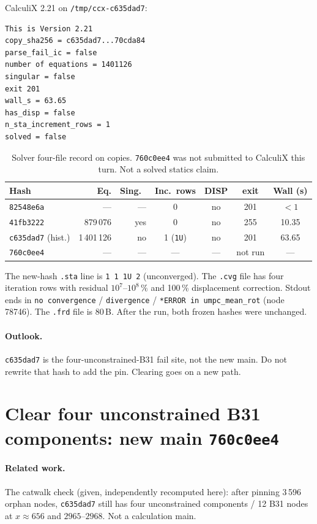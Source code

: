 \documentclass[11pt,a4paper]{article}
\begin{document}
CalculiX 2.21 on \texttt{/tmp/ccx-c635dad7}:
\begin{lstlisting}
This is Version 2.21
copy_sha256 = c635dad7...70cda84
parse_fail_ic = false
number of equations = 1401126
singular = false
exit 201
wall_s = 63.65
has_disp = false
n_sta_increment_rows = 1
solved = false
\end{lstlisting}

\begin{table}[ht]
\centering
\caption{Solver four-file record on copies. \texttt{760c0ee4} was not submitted to CalculiX this turn. Not a solved statics claim.}
\label{tab:ccx}
\begin{tabular}{lrrcccc}
\toprule
Hash & Eq. & Sing.\ & Inc.\ rows & DISP & exit & Wall (s) \\
\midrule
\texttt{82548e6a} & --- & --- & 0 & no & 201 & \(<1\) \\
\texttt{41fb3222} & 879\,076 & yes & 0 & no & 255 & 10.35 \\
\texttt{c635dad7} (hist.) & 1\,401\,126 & no & 1 (\texttt{1U}) & no & 201 & 63.65 \\
\texttt{760c0ee4} & --- & --- & --- & --- & not run & --- \\
\bottomrule
\end{tabular}
\end{table}

The new-hash \texttt{.sta} line is \texttt{1 1 1U 2} (unconverged). The
\texttt{.cvg} file has four iteration rows with residual
\(10^{7}\)--\(10^{8}\,\%\) and 100\,\% displacement correction. Stdout ends
in \texttt{no convergence} / \texttt{divergence} /
\texttt{*ERROR in umpc\_mean\_rot} (node 78746). The \texttt{.frd} file is
80\,B. After the run, both frozen hashes were unchanged.

\paragraph{Outlook.}
\texttt{c635dad7} is the four-unconstrained-B31 fail site, not the new main.
Do not rewrite that hash to add the pin. Clearing goes on a new path.

\section{Clear four unconstrained B31 components: new main \texttt{760c0ee4}}
\label{sec:clear}

\paragraph{Related work.}
The catwalk check (given, independently recomputed here): after pinning
3\,596 orphan nodes, \texttt{c635dad7} still has four unconstrained
components / 12 B31 nodes at \(x\approx 656\) and \(2965\)--\(2968\).
Not a calculation main.
\end{document}
